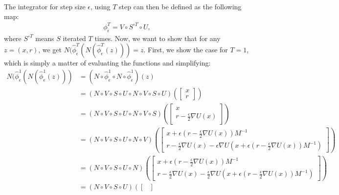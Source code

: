 The integrator for step size $\epsilon$, using $T$ step can then be defined as the following map:
\begin{align}
    \phi^T_\epsilon = V\circ S^{\circ T} \circ U,
\end{align}
where $S^{\circ T}$ means $S$ iterated $T$ times.
Now, we want to show that for any $z=(x, r)$, we get $N(\hat{\phi}^T_\epsilon(N(\hat{\phi}^T_\epsilon(z))) = z$.
First, we show the case for $T=1$, which is simply a matter of evaluating the functions and simplifying:
\begin{equation}
    \begin{aligned}
        N (\hat{\phi}^1_\epsilon(N(\hat{\phi}^1_\epsilon(z))) 
        &=
        (N \circ \hat{\phi}^1_\epsilon \circ N \circ \hat{\phi}^1_\epsilon)(z) \\
        &= (N \circ V \circ S \circ U \circ N \circ V \circ S \circ U )\left( 
        \begin{bmatrix}
            x \\ r
        \end{bmatrix}
        \right) \\
        &= (N\circ V \circ S \circ U \circ N \circ V\circ S) \left(
        \begin{bmatrix}
            x \\ r - \frac{\epsilon}{2} \nabla U(x)
        \end{bmatrix}
        \right) \\
        &= (N\circ V \circ S \circ U \circ N \circ V )\left(
        \begin{bmatrix}
            x + \epsilon (r - \frac{\epsilon}{2} \nabla U(x)) M^{-1} \\ 
            r - \frac{\epsilon}{2} \nabla U(x) - \epsilon \nabla U(x + \epsilon (r - \frac{\epsilon}{2} \nabla U(x)) M^{-1})
        \end{bmatrix}
        \right) \\
        &= (N\circ V \circ S \circ U \circ N )\left(
        \begin{bmatrix}
            x + \epsilon (r - \frac{\epsilon}{2} \nabla U(x)) M^{-1} \\ 
            r - \frac{\epsilon}{2} \nabla U(x) - \frac{\epsilon}{2} \nabla U(x + \epsilon (r - \frac{\epsilon}{2} \nabla U(x)) M^{-1})
        \end{bmatrix}
        \right) \\
        &= (N\circ V \circ S \circ U )\left(
        \begin{bmatrix}

\end{bmatrix}
\end{aligned}
\end{equation}
